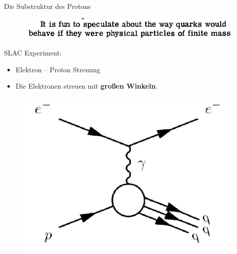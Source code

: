 \documentclass[t,9pt]{beamer}
\newcommand{\highlight}[3]{ \begin{textblock*}{#1}(#2,#3) \begin{tcolorbox} [enhanced,opacityfill=.1,colback=blue] \end{tcolorbox} \end{textblock*} } %
\begin{document}
        \begin{frame}{Die Substruktur des Protons}
                \begin{figure}
                        \includegraphics[width=\textwidth]{prosi_if_quarks_were_physical.png}
                        \caption*{\cite{Gellmann1964}}
                \end{figure}
                \pause
                \begin{minipage}{.45\textwidth}
                SLAC Experiment:
                \begin{itemize}
                        \item Elektron -- Proton Streuung
                        \item Die Elektronen streuen mit \textbf{großen Winkeln}.
                \end{itemize}
                \begin{figure}
                        \includegraphics[width=.6\textwidth]{prosi_electron_proton_inelastic_feynman.png}
                        \caption*{\cite{Schmidt2014}}
                \end{figure}
                \end{minipage}
                \begin{minipage}{.5\textwidth}

\end{minipage}
\end{frame}
\end{document}
